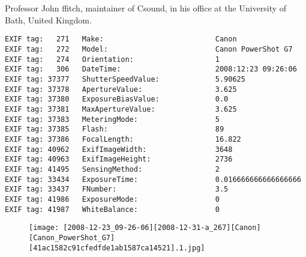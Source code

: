 \section{\protect{}}
\noindent Professor John ffitch, maintainer of Csound, in his office at the University of Bath, United Kingdom.
\noindent
\begin{lstlisting}
EXIF tag:   271   Make:                          Canon
EXIF tag:   272   Model:                         Canon PowerShot G7
EXIF tag:   274   Orientation:                   1
EXIF tag:   306   DateTime:                      2008:12:23 09:26:06
EXIF tag: 37377   ShutterSpeedValue:             5.90625
EXIF tag: 37378   ApertureValue:                 3.625
EXIF tag: 37380   ExposureBiasValue:             0.0
EXIF tag: 37381   MaxApertureValue:              3.625
EXIF tag: 37383   MeteringMode:                  5
EXIF tag: 37385   Flash:                         89
EXIF tag: 37386   FocalLength:                   16.822
EXIF tag: 40962   ExifImageWidth:                3648
EXIF tag: 40963   ExifImageHeight:               2736
EXIF tag: 41495   SensingMethod:                 2
EXIF tag: 33434   ExposureTime:                  0.016666666666666666
EXIF tag: 33437   FNumber:                       3.5
EXIF tag: 41986   ExposureMode:                  0
EXIF tag: 41987   WhiteBalance:                  0

\end{lstlisting}
\clearpage
\begin{figure}
\raggedleft
\texttt{[image: [2008-12-23\_09-26-06][2008-12-31-a\_267][Canon][Canon\_PowerShot\_G7][41ac1582c91cfedfde1ab1587ca14521].1.jpg]}
\end{figure}


\clearpage
